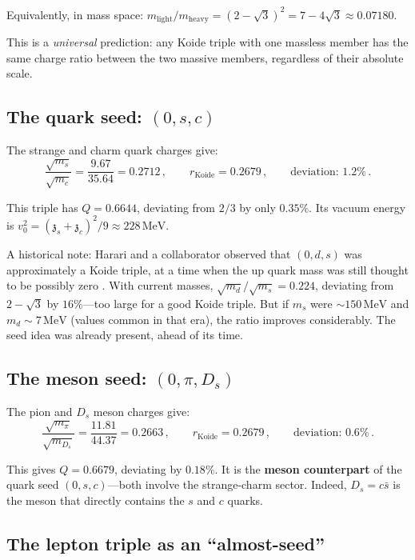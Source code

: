 \documentclass[12pt,a4paper]{article}
\newcommand{\MeV}{\,\text{MeV}}
\newcommand{\zch}{\mathfrak{z}}
\begin{document}
Equivalently, in mass space: 
$m_{\text{light}}/m_{\text{heavy}} = (2 - \sqrt{3})^2 = 7 - 4\sqrt{3} 
\approx 0.07180$.

This is a \emph{universal} prediction: any Koide triple with one 
massless member has the same charge ratio between the two massive 
members, regardless of their absolute scale.

\subsection{The quark seed: $(0, s, c)$}

The strange and charm quark charges give:
\begin{equation}
\frac{\sqrt{m_s}}{\sqrt{m_c}} = \frac{9.67}{35.64} = 0.2712\,, 
\qquad r_{\text{Koide}} = 0.2679\,, \qquad \text{deviation: } 1.2\%\,.
\end{equation}

This triple has $Q = 0.6644$, deviating from $2/3$ by only $0.35\%$. 
Its vacuum energy is $v_0^2 = (\zch_s + \zch_c)^2/9 \approx 228\MeV$.

A historical note: Harari and a collaborator observed that $(0, d, s)$ 
was approximately a Koide triple, at a time when the up quark mass was 
still thought to be possibly zero \cite{Harari}. With current masses, 
$\sqrt{m_d}/\sqrt{m_s} = 0.224$, deviating from $2 - \sqrt{3}$ by 
$16\%$---too large for a good Koide triple. But if $m_s$ were 
$\sim 150\MeV$ and $m_d \sim 7\MeV$ (values common in that era), the 
ratio improves considerably. The seed idea was already present, ahead 
of its time.

\subsection{The meson seed: $(0, \pi, D_s)$}

The pion and $D_s$ meson charges give:
\begin{equation}
\frac{\sqrt{m_\pi}}{\sqrt{m_{D_s}}} = \frac{11.81}{44.37} = 0.2663\,, 
\qquad r_{\text{Koide}} = 0.2679\,, \qquad \text{deviation: } 0.6\%\,.
\end{equation}

This gives $Q = 0.6679$, deviating by $0.18\%$. It is the 
\textbf{meson counterpart} of the quark seed $(0, s, c)$---both 
involve the strange-charm sector. Indeed, $D_s = c\bar{s}$ is the 
meson that directly contains the $s$ and $c$ quarks.

\subsection{The lepton triple as an ``almost-seed''}
\end{document}
